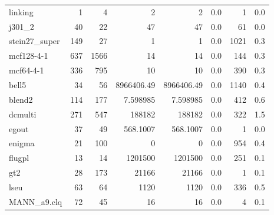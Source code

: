 \documentclass[leqno]{article}
\begin{document}
\begin{center}
\setlength{\tabcolsep}{2pt}
\newcommand{\g}{\raisebox{0.25ex}{\tiny $>$}}
\tablelasttail{\bottomrule}
\begin{supertabular*}{\textwidth}{@{\extracolsep{\fill}}lrrrrrrr@{}}
linking            &      1 &      4 &                2 &                2 &    0.0 &         1 &      0.0\\
j301\_2            &     40 &     22 &               47 &               47 &    0.0 &        61 &      0.0\\
stein27\_super     &    149 &     27 &                1 &                1 &    0.0 &      1021 &      0.3\\
mcf128-4-1         &    637 &   1566 &               14 &               14 &    0.0 &       144 &      0.3\\
mcf64-4-1          &    336 &    795 &               10 &               10 &    0.0 &       390 &      0.3\\
bell5              &     34 &     56 &       8966406.49 &       8966406.49 &    0.0 &      1140 &      0.4\\
blend2             &    114 &    177 &         7.598985 &         7.598985 &    0.0 &       412 &      0.6\\
dcmulti            &    271 &    547 &           188182 &           188182 &    0.0 &       322 &      1.5\\
egout              &     37 &     49 &         568.1007 &         568.1007 &    0.0 &         1 &      0.0\\
enigma             &     21 &    100 &                0 &                0 &    0.0 &       954 &      0.4\\
flugpl             &     13 &     14 &          1201500 &          1201500 &    0.0 &       251 &      0.1\\
gt2                &     28 &    173 &            21166 &            21166 &    0.0 &         1 &      0.1\\
lseu               &     63 &     64 &             1120 &             1120 &    0.0 &       336 &      0.5\\
MANN\_a9.clq       &     72 &     45 &               16 &               16 &    0.0 &         4 &      0.1\\

\end{supertabular*}
\end{center}
\end{document}
